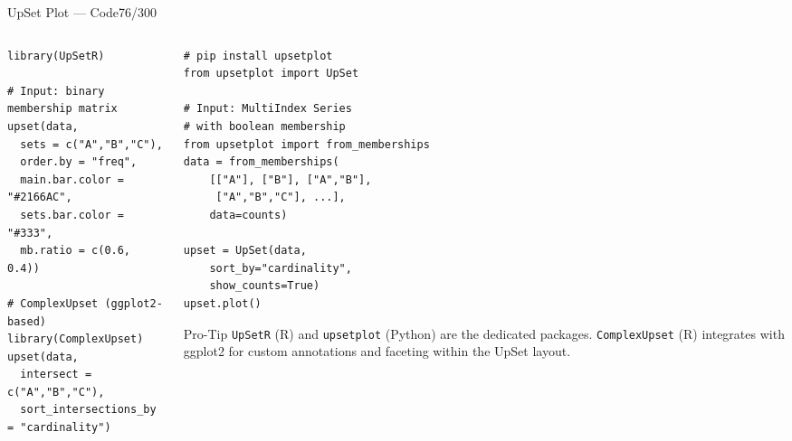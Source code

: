 \documentclass[10pt]{beamer}
\newcommand{\smark}[1]{\hfill{\scriptsize\color{codegray}#1}}
\begin{document}
\begin{frame}[fragile]{UpSet Plot --- Code}\smark{76/300}
\begin{columns}[T]
\begin{column}{0.48\textwidth}
\begin{lstlisting}[style=Rstyle]
library(UpSetR)

# Input: binary membership matrix
upset(data,
  sets = c("A","B","C"),
  order.by = "freq",
  main.bar.color = "#2166AC",
  sets.bar.color = "#333",
  mb.ratio = c(0.6, 0.4))

# ComplexUpset (ggplot2-based)
library(ComplexUpset)
upset(data,
  intersect = c("A","B","C"),
  sort_intersections_by = "cardinality")
\end{lstlisting}
\end{column}
\begin{column}{0.48\textwidth}
\begin{lstlisting}[style=Pystyle]
# pip install upsetplot
from upsetplot import UpSet

# Input: MultiIndex Series
# with boolean membership
from upsetplot import from_memberships
data = from_memberships(
    [["A"], ["B"], ["A","B"],
     ["A","B","C"], ...],
    data=counts)

upset = UpSet(data,
    sort_by="cardinality",
    show_counts=True)
upset.plot()
\end{lstlisting}
\vspace{0.1cm}
\begin{alertblock}{Pro-Tip}
    \scriptsize \texttt{UpSetR} (R) and \texttt{upsetplot} (Python) are the dedicated packages. \texttt{ComplexUpset} (R) integrates with ggplot2 for custom annotations and faceting within the UpSet layout.
\end{alertblock}
\end{column}
\end{columns}
\end{frame}
\end{document}

